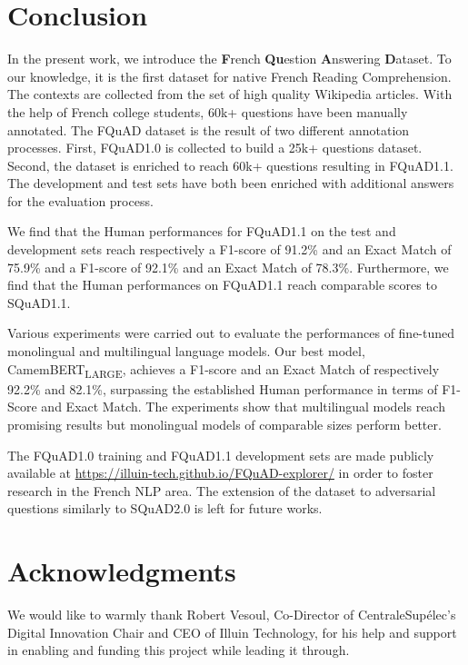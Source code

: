 \documentclass{article}
\begin{document}
 
\section{Conclusion}
\label{section:conclusion}
In the present work, we introduce the \textbf{F}rench \textbf{Qu}estion \textbf{A}nswering \textbf{D}ataset.
To our knowledge, it is the first dataset for native French Reading Comprehension. 
The contexts are collected from the set of high quality Wikipedia articles.
With the help of French college students, 60k+ questions have been manually annotated.
The FQuAD dataset is the result of two different annotation processes.
First, FQuAD1.0 is collected to build a 25k+ questions dataset.
Second, the dataset is enriched to reach 60k+ questions resulting in FQuAD1.1.
The development and test sets have both been enriched with additional answers for the evaluation process.

We find that the Human performances for FQuAD1.1 on the test and development sets reach respectively
a F1-score of 91.2\% and an Exact Match of 75.9\% and a F1-score of 92.1\% and an Exact Match of 78.3\%. 
Furthermore, we find that the Human performances on FQuAD1.1 reach comparable scores to SQuAD1.1.


Various experiments were carried out to evaluate the performances of fine-tuned monolingual and multilingual language models.
Our best model, CamemBERT\textsubscript{LARGE}, achieves a F1-score and an Exact Match of respectively 92.2\% and 82.1\%, surpassing the established Human performance in terms of F1-Score and Exact Match.
The experiments show that multilingual models reach promising results but monolingual models of comparable sizes perform better.


The FQuAD1.0 training and FQuAD1.1 development sets are made publicly available at \url{https://illuin-tech.github.io/FQuAD-explorer/} in order to foster research in the French NLP area.
The extension of the dataset to adversarial questions similarly to SQuAD2.0 is left for future works.



%
 
\section{Acknowledgments}
We would like to warmly thank Robert Vesoul, Co-Director of CentraleSupélec's Digital Innovation Chair and CEO of Illuin Technology, for his help and support in enabling and funding this project while leading it through.
\end{document}
